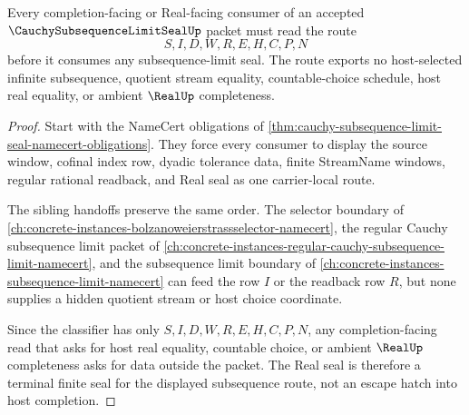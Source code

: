 \begin{theorem}
\label{thm:cauchy-subsequence-limit-seal-nonescape}
Every completion-facing or Real-facing consumer of an accepted $\CauchySubsequenceLimitSealUp$ packet must read the route
$$
S,I,D,W,R,E,H,C,P,N
$$
before it consumes any subsequence-limit seal. The route exports no host-selected infinite subsequence, quotient stream equality, countable-choice schedule, host real equality, or ambient $\RealUp$ completeness.
\end{theorem}
\begin{proof}
Start with the NameCert obligations of \autoref{thm:cauchy-subsequence-limit-seal-namecert-obligations}. They force every consumer to display the source window, cofinal index row, dyadic tolerance data, finite StreamName windows, regular rational readback, and Real seal as one carrier-local route.

The sibling handoffs preserve the same order. The selector boundary of \autoref{ch:concrete-instances-bolzanoweierstrassselector-namecert}, the regular Cauchy subsequence limit packet of \autoref{ch:concrete-instances-regular-cauchy-subsequence-limit-namecert}, and the subsequence limit boundary of \autoref{ch:concrete-instances-subsequence-limit-namecert} can feed the row $I$ or the readback row $R$, but none supplies a hidden quotient stream or host choice coordinate.

Since the classifier has only $S,I,D,W,R,E,H,C,P,N$, any completion-facing read that asks for host real equality, countable choice, or ambient $\RealUp$ completeness asks for data outside the packet. The Real seal is therefore a terminal finite seal for the displayed subsequence route, not an escape hatch into host completion.
\end{proof}


\begin{closurestatus}{\CauchySubsequenceLimitSealUp}
  \theoryclosure{\seedClosure}
  \formalstatus{\unformalizedV}
\end{closurestatus}
